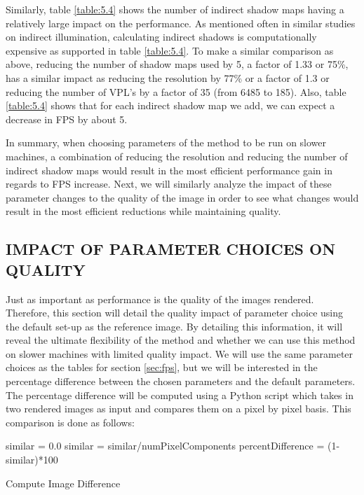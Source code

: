 Similarly, table \ref{table:5.4} shows the number of indirect shadow maps having a relatively large impact on the performance.  As mentioned often in similar studies on indirect illumination, calculating indirect shadows is computationally expensive as supported in table \ref{table:5.4}.  To make a similar comparison as above, reducing the number of shadow maps used by 5, a factor of 1.33 or 75\%, has a similar impact as reducing the resolution by 77\% or a factor of 1.3 or reducing the number of VPL's by a factor of 35 (from 6485 to 185).  Also, table \ref{table:5.4} shows that for each indirect shadow map we add, we can expect a decrease in FPS by about 5.

In summary, when choosing parameters of the method to be run on slower machines, a combination of reducing the resolution and reducing the number of indirect shadow maps would result in the most efficient performance gain in regards to FPS increase.  Next, we will similarly analyze the impact of these parameter changes to the quality of the image in order to see what changes would result in the most efficient reductions while maintaining quality.

\subsection{IMPACT OF PARAMETER CHOICES ON QUALITY} \label{sec:quality}
Just as important as performance is the quality of the images rendered.  Therefore, this section will detail the quality impact of parameter choice using the default set-up as the reference image.  By detailing this information, it will reveal the ultimate flexibility of the method and whether we can use this method on slower machines with limited quality impact.  We will use the same parameter choices as the tables for section \ref{sec:fps}, but we will be interested in the percentage difference between the chosen parameters and the default parameters.  The percentage difference will be computed using a Python script which takes in two rendered images as input and compares them on a pixel by pixel basis.  This comparison is done as follows:


\begin{algorithm}[H]
 \SetAlgoLined
 similar = 0.0\;
 similar = similar/numPixelComponents\;
 percentDifference = (1-similar)*100\;
 \caption{Compute Image Difference}
 \label{alg:difference}
\end{algorithm}

